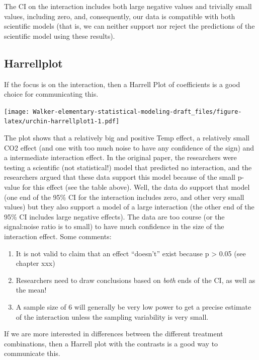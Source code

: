 \documentclass[]{book}
\providecommand{\tightlist}{%
  \setlength{\itemsep}{0pt}\setlength{\parskip}{0pt}}
\begin{document}
The CI on the interaction includes both large negative values and
trivially small values, including zero, and, consequently, our data is
compatible with both scientific models (that is, we can neither support
nor reject the predictions of the scientific model using these results).

\subsection{Harrellplot}\label{harrellplot}

If the focus is on the interaction, then a Harrell Plot of coefficients
is a good choice for communicating this.

\texttt{[image: Walker-elementary-statistical-modeling-draft\_files/figure-latex/urchin-harrellplot1-1.pdf]}

The plot shows that a relatively big and positive Temp effect, a
relatively small CO2 effect (and one with too much noise to have any
confidence of the sign) and a intermediate interaction effect. In the
original paper, the researchers were testing a scientific (not
statistical!) model that predicted no interaction, and the researchers
argued that these data support this model because of the small p-value
for this effect (see the table above). Well, the data do support that
model (one end of the 95\% CI for the interaction includes zero, and
other very small values) but they also support a model of a large
interaction (the other end of the 95\% CI includes large negative
effects). The data are too course (or the signal:noise ratio is to
small) to have much confidence in the size of the interaction effect.
Some comments:

\begin{enumerate}
\def\labelenumi{\arabic{enumi}.}
\tightlist
\item
  It is not valid to claim that an effect ``doesn't'' exist because p
  \textgreater{} 0.05 (see chapter xxx)
\item
  Researchers need to draw conclusions based on \emph{both} ends of the
  CI, as well as the mean!
\item
  A sample size of 6 will generally be very low power to get a precise
  estimate of the interaction unless the sampling variability is very
  small.
\end{enumerate}

If we are more interested in differences between the different treatment
combinations, then a Harrell plot with the contrasts is a good way to
communicate this.
\end{document}
